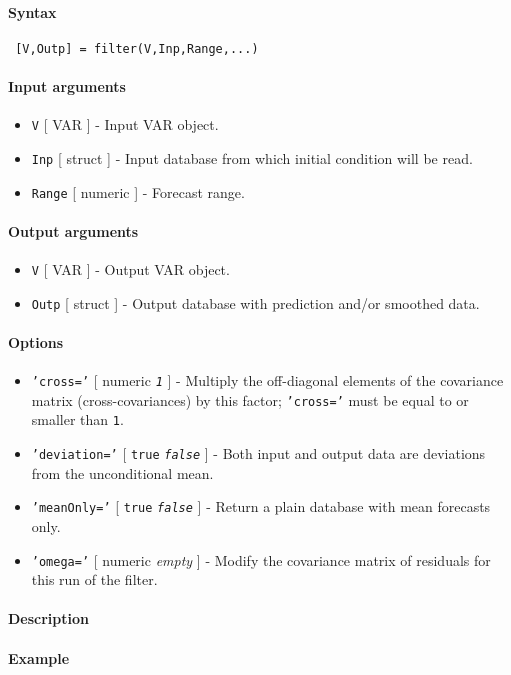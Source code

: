 


	\paragraph{Syntax}
 
 \begin{verbatim}
 [V,Outp] = filter(V,Inp,Range,...)
 \end{verbatim}
 
 \paragraph{Input arguments}
 
 \begin{itemize}
 \item
   \texttt{V} {[} VAR {]} - Input VAR object.
 \item
   \texttt{Inp} {[} struct {]} - Input database from which initial
   condition will be read.
 \item
   \texttt{Range} {[} numeric {]} - Forecast range.
 \end{itemize}
 
 \paragraph{Output arguments}
 
 \begin{itemize}
 \item
   \texttt{V} {[} VAR {]} - Output VAR object.
 \item
   \texttt{Outp} {[} struct {]} - Output database with prediction and/or
   smoothed data.
 \end{itemize}
 
 \paragraph{Options}
 
 \begin{itemize}
 \item
   \texttt{'cross='} {[} numeric \textbar{} \emph{\texttt{1}} {]} -
   Multiply the off-diagonal elements of the covariance matrix
   (cross-covariances) by this factor; \texttt{'cross='} must be equal to
   or smaller than \texttt{1}.
 \item
   \texttt{'deviation='} {[} \texttt{true} \textbar{}
   \emph{\texttt{false}} {]} - Both input and output data are deviations
   from the unconditional mean.
 \item
   \texttt{'meanOnly='} {[} \texttt{true} \textbar{}
   \emph{\texttt{false}} {]} - Return a plain database with mean
   forecasts only.
 \item
   \texttt{'omega='} {[} numeric \textbar{} \emph{empty} {]} - Modify the
   covariance matrix of residuals for this run of the filter.
 \end{itemize}
 
 \paragraph{Description}
 
 \paragraph{Example}


